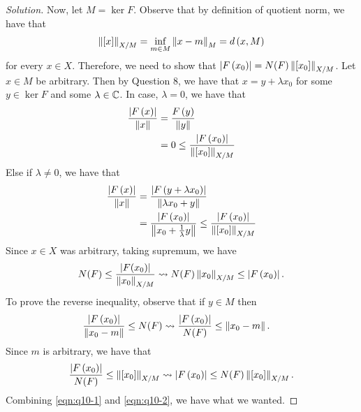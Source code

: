 \begin{proof}[Solution]
    Now, let $M=\ker F$. Observe that by definition of quotient norm, we have that 
    \begin{align*}
	\left\lVert [x] \right\rVert_{X/M} = \inf_{m\in M} \left\lVert x-m \right\rVert_{M} = d\left( x, M \right)
    \end{align*}
    for every $x\in X$.
    Therefore, we need to show that $\left\lvert F\left( x_{0} \right) \right\rvert = N(F) \left\lVert [x_{0}] \right\rVert_{X/M}$. Let $x\in M$ be arbitrary. Then by Question 8, we have that $x=y + \lambda x_{0}$ for some $y \in \ker F$ and some $\lambda \in \mathbb C$. In case, $\lambda = 0$, we have that 
    \begin{align*}
\frac{\left\lvert F\left( x \right) \right\rvert}{\left\lVert x \right\rVert} &= \frac{F\left( y\right)}{\left\lVert y \right\rVert} \\
&= 0 \le \frac{\left\lvert F\left( x_{0} \right) \right\rvert}{\left\lVert [x_{0}] \right\rVert_{X/M}}
    \end{align*}
    Else if $\lambda \ne 0$, we have that
    \begin{align*}
	\frac{\left\lvert F\left( x \right) \right\rvert}{\left\lVert x \right\rVert} &=  \frac{\left\lvert F\left( y+ \lambda x_{0} \right) \right\rvert}{\left\lVert \lambda x_{0} + y \right\rVert} \\
	&= \frac{\left\lvert F\left( x_{0} \right) \right\rvert}{\left\lVert x_{0} + \frac{1}{\lambda}y \right\rVert}
\le \frac{\left\lvert F\left( x_{0} \right) \right\rvert}{\left\lVert [x_{0}] \right\rVert_{X/M}}
    \end{align*}
    Since $x\in X$ was arbitrary, taking supremum, we have
    \begin{equation}
	N(F) \le \frac{\left\lvert F(x_{0}) \right\rvert}{\left\lVert x_{0} \right\rVert_{X/M}} \leadsto N(F) \left\lVert x_{0} \right\rVert_{X/M} \le \left\lvert F\left( x_{0} \right) \right\rvert\text{.}
	\label{eqn:q10-1}
    \end{equation}
     To prove the reverse inequality, observe that if $y\in M$ then
     \begin{align*}
	 \frac{\left\lvert F\left( x_{0} \right) \right\rvert}{\left\lVert x_{0}-m \right\rVert} \le N(F) &\leadsto \frac{\left\lvert F\left( x_{0} \right) \right\rvert}{N(F)} \le \left\lVert x_{0}-m \right\rVert\text{.}
     \end{align*}
     Since $m$ is arbitrary, we have that
     \begin{align}
	 \frac{\left\lvert F\left( x_{0} \right) \right\rvert}{N(F)} \le \left\lVert [x_{0}] \right\rVert_{X/M}
	 \leadsto \left\lvert F\left( x_{0} \right) \right\rvert \le N(F)  \left\lVert [x_{0}] \right\rVert_{X/M}\text{.}
	 \label{eqn:q10-2}
     \end{align}
     Combining \ref{eqn:q10-1} and \ref{eqn:q10-2}, we have what we wanted.
\end{proof}
